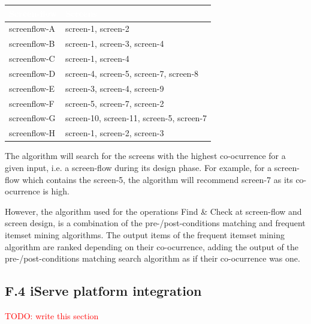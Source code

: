 \documentclass{fast_latex}
\begin{document}
\begin{table}[h]
\begin{center}
\begin{tabular}{|p{3.5cm}|p{10cm}|}
\hline
\rowcolor{fast@lightgrey}\textcolor{white}{Screen-flow} &
                         \textcolor{white}{Screens} \\ \hline
screenflow-A & screen-1, screen-2 \\ \hline
screenflow-B & screen-1, screen-3, screen-4 \\ \hline
screenflow-C & screen-1, screen-4 \\ \hline
screenflow-D & screen-4, screen-5, screen-7, screen-8 \\ \hline
screenflow-E & screen-3, screen-4, screen-9 \\ \hline
screenflow-F & screen-5, screen-7, screen-2 \\ \hline
screenflow-G & screen-10, screen-11, screen-5, screen-7 \\ \hline
screenflow-H & screen-1, screen-2, screen-3 \\ \hline
\end{tabular}
\end{center}
\end{table}

The algorithm will search for the screens with the highest co-ocurrence for a given input, i.e. a screen-flow during its design phase. For example, for a screen-flow which contains the screen-5, the algorithm will recommend screen-7 as its co-ocurrence is high.

However, the algorithm used for the operations Find \& Check at screen-flow and screen design, is a combination of the pre-/post-conditions matching and frequent itemset mining algorithms. The output items of the frequent itemset mining algorithm are ranked depending on their co-ocurrence, adding the output of the pre-/post-conditions matching search algorithm as if their co-ocurrence was one.


\subsection*{F.4 iServe platform integration}

\textcolor{red}{TODO: write this section}
\end{document}
